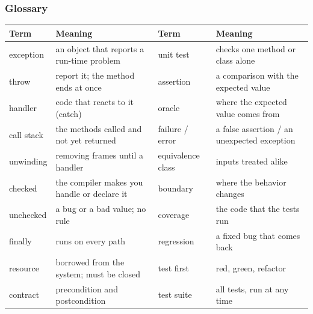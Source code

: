 \documentclass[aspectratio=169,10pt,compress]{beamer}
\begin{document}
\begin{frame}[t,fragile] \frametitle{Glossary}


\begin{table}
		\scriptsize
		\begin{tabular}{@{}L{0.15\textwidth}L{0.30\textwidth}L{0.17\textwidth}L{0.29\textwidth}@{}}
			\toprule
			\textbf{Term} & \textbf{Meaning} & \textbf{Term} & \textbf{Meaning} \\
			\midrule
			exception   & an object that reports a run-time problem   & unit test     & checks one method or class alone \\
			throw       & report it; the method ends at once          & assertion     & a comparison with the expected value \\
			handler     & code that reacts to it (catch)              & oracle        & where the expected value comes from \\
			call stack  & the methods called and not yet returned     & failure / error & a false assertion / an unexpected exception \\
			unwinding   & removing frames until a handler             & equivalence class & inputs treated alike \\
			checked     & the compiler makes you handle or declare it & boundary      & where the behavior changes \\
			unchecked   & a bug or a bad value; no rule               & coverage      & the code that the tests run \\
			finally     & runs on every path                          & regression    & a fixed bug that comes back \\
			resource    & borrowed from the system; must be closed    & test first    & red, green, refactor \\
			contract    & precondition and postcondition              & test suite    & all tests, run at any time \\
			\bottomrule
		\end{tabular}
\end{table}%
\end{frame}
\end{document}
